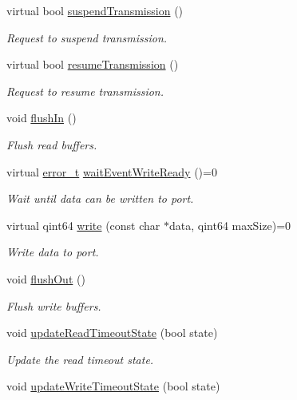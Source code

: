 \begin{DoxyCompactItemize}
virtual bool \hyperlink{classmdt_abstract_port_aff3d79248baf96e670eba6d2fef700b9}{suspendTransmission} ()
\begin{DoxyCompactList}\small\item\em Request to suspend transmission. \end{DoxyCompactList}\item 
virtual bool \hyperlink{classmdt_abstract_port_ad4a04c995df881593db0a309000be7a7}{resumeTransmission} ()
\begin{DoxyCompactList}\small\item\em Request to resume transmission. \end{DoxyCompactList}\item 
void \hyperlink{classmdt_abstract_port_a32329b4188db796401e4f454755acb44}{flushIn} ()
\begin{DoxyCompactList}\small\item\em Flush read buffers. \end{DoxyCompactList}\item 
virtual \hyperlink{classmdt_abstract_port_ad4121bb930c95887e77f8bafa065a85e}{error\_\-t} \hyperlink{classmdt_abstract_port_a35e4686f50e2c53c7e3618cf2c485d92}{waitEventWriteReady} ()=0
\begin{DoxyCompactList}\small\item\em Wait until data can be written to port. \end{DoxyCompactList}\item 
virtual qint64 \hyperlink{classmdt_abstract_port_a64d4802975a76474b9196c91f57a6d90}{write} (const char $\ast$data, qint64 maxSize)=0
\begin{DoxyCompactList}\small\item\em Write data to port. \end{DoxyCompactList}\item 
void \hyperlink{classmdt_abstract_port_ad199c6310801893f1f7de2a2391606fc}{flushOut} ()
\begin{DoxyCompactList}\small\item\em Flush write buffers. \end{DoxyCompactList}\item 
void \hyperlink{classmdt_abstract_port_a0fc7317e988d5dea53a999cd1bf4faa9}{updateReadTimeoutState} (bool state)
\begin{DoxyCompactList}\small\item\em Update the read timeout state. \end{DoxyCompactList}\item 
void \hyperlink{classmdt_abstract_port_ab51135de1f7bbc4707c3284f924c98dc}{updateWriteTimeoutState} (bool state)

\end{DoxyCompactItemize}
